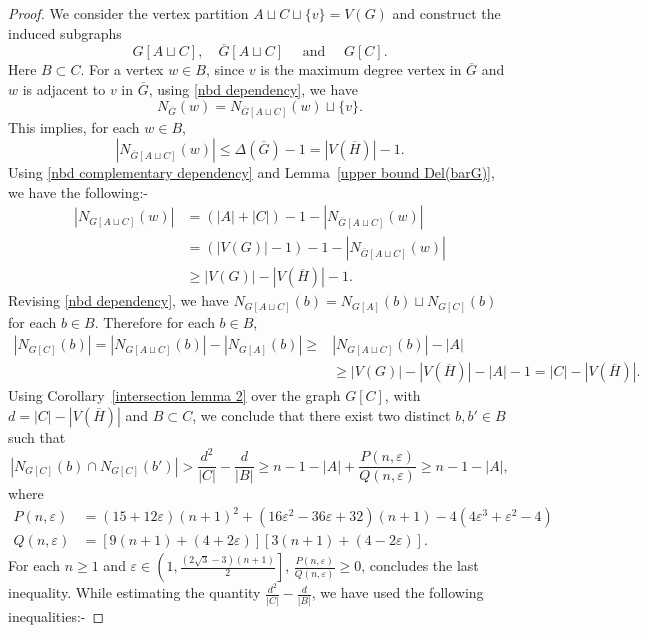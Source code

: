 \documentclass[reqno,10pt]{amsart}
\theoremstyle{definition}
\begin{document}
\begin{proof}
We  consider the vertex partition $A\sqcup C\sqcup\{v\}=V(G)$ and construct the induced subgraphs 
\begin{equation*}
 G[A\sqcup C],\quad\overline{G}[A\sqcup C]\quad\text{ and }\quad G[C].   
\end{equation*}
Here $B\subset C$.  For a vertex $w\in B$, since $v$ is the maximum degree vertex in $\overline{G}$ and $w$ is adjacent to $v$ in $\overline{G}$, using \eqref{nbd dependency}, we have 
\begin{equation*}
 N_{\overline{G}}(w)=N_{\overline{G}[A\sqcup C]}(w)\sqcup\{v\}.   
\end{equation*}
This implies, for each $w\in B$,
\begin{equation*}
|N_{\overline{G}[A\sqcup C]}(w)|\leq\Delta(\overline{G})-1=|V(\overline{H})|-1.
\end{equation*}
Using \eqref{nbd complementary dependency} and Lemma~\ref{upper bound Del(barG)}, we have the following:- 
\begin{align*}
|N_{G[A\sqcup C]}(w)|&=(|A|+|C|)-1-|N_{\overline{G}[A\sqcup C]}(w)|\\
&=(|V(G)|-1)-1-|N_{\overline{G}[A\sqcup C]}(w)|\\
&\geq |V(G)|-|V(\overline{H})|-1.
\end{align*}
Revising \eqref{nbd dependency}, we have $N_{G[A\sqcup C]}(b)=N_{G[A]}(b)\sqcup N_{G[C]}(b)$ for each $b\in B$. Therefore for each $b\in B$,
\begin{align*}
|N_{G[C]}(b)|=|N_{G[A\sqcup C]}(b)|-|N_{G[A]}(b)|\geq &|N_{G[A\sqcup C]}(b)|-|A|\\
&\geq |V(G)|-|V(\overline{H})|-|A|-1=|C|-|V(\overline{H})|.   
\end{align*}
Using Corollary~\ref{intersection lemma 2} over the graph $G[C]$, with $d=|C|-|V(\overline{H})|$ and $B\subset C$,  we conclude that there exist two distinct $b,b'\in B$ such that
\begin{equation*}
|N_{G[C]}(b)\cap N_{G[C]}(b')|>\frac{d^{2}}{|C|}-\frac{d}{|B|}\geq n-1-|A|+\frac{P(n,\varepsilon)}{Q(n,\varepsilon)}\geq n-1-|A|,    
\end{equation*}
where 
\begin{align*}
P(n,\varepsilon)&=(15+12\varepsilon)(n+1)^{2}+(16\varepsilon^{2}-36\varepsilon+32)(n+1)-4(4\varepsilon^{3}+\varepsilon^{2}-4)\\
Q(n,\varepsilon)&=[9(n+1)+(4+2\varepsilon)][3(n+1)+(4-2\varepsilon)]. 
\end{align*}
For each $n\geq 1$ and $\varepsilon\in\left(1,\frac{(2\sqrt{3}-3)(n+1)}{2}\right]$, $\frac{P(n,\varepsilon)}{Q(n,\varepsilon)}\geq0$, concludes the last inequality. While estimating the quantity $\frac{d^{2}}{|C|}-\frac{d}{|B|}$, we have used the following inequalities:- 

\end{proof}
\end{document}
